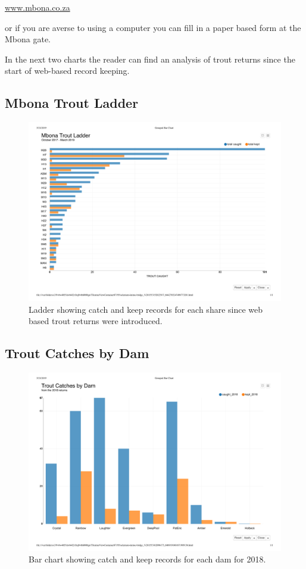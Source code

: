 \url{www.mbona.co.za} 

or if you are averse to using a computer you can fill in a paper based form at the Mbona gate.

In the next two charts the reader can find an analysis of trout returns since the start of
web-based record keeping.

\subsection{Mbona Trout Ladder}

\begin{figure}[H]
\centering
  \includegraphics[scale=0.4]{tables/MbonaTroutLadder.pdf}
   \caption{Ladder showing catch and keep records for each share since web based trout returns were introduced.}
  \label{fig:MbonaTroutLadder}
\end{figure}


\subsection{Trout Catches by Dam}

\begin{figure}[H]
\centering
  \includegraphics[scale=0.4]{tables/TroutCatchesByDam.pdf}
   \caption{Bar chart showing catch and keep records for each dam for 2018.}
  \label{fig:TroutCatchesByDam}
\end{figure}



